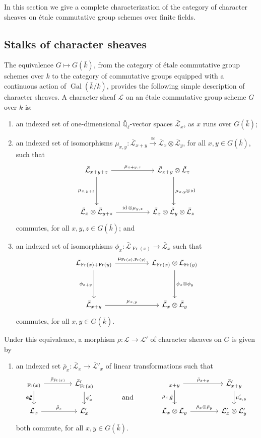 \documentclass[10pt]{amsart}
\makeatletter
\theoremstyle{plain}
\theoremstyle{definition}
\newcommand{\EE}{\mathbb{\bar Q}_\ell}
\newcommand{\bFq}{\bar{k}}
\newcommand{\Fq}{k}
\DeclareMathOperator{\Gal}{Gal}
\newcommand{\Frob}[1]{\operatorname{Fr}_{#1}}
\DeclareMathOperator{\id}{id}
\newcommand{\iso}{{\ \cong\ }}
\newcommand{\cs}[1]{{\mathcal{#1}}}
\newcommand{\gcs}[1]{{\mathcal{\bar #1}}}
\newcommand{\labitem}[2]{
\def\@itemlabel{\textbf{#1}}
\item
\def\@currentlabel{#1}\label{#2}}
\newcommand{\brho}{{\bar\rho}}
\newcommand{\tight}[3]{\hspace{-#1pt}{#2}\hspace{-#3pt}}
\makeatother
\begin{document}
In this section we give a complete characterization of the category of character sheaves on \'etale commutative group schemes over finite fields.

\subsection{Stalks of character sheaves}\label{ssec:stalks}

The equivalence $G \mapsto G(\bFq)$,
from the category of \'etale commutative group schemes over $\Fq$ to the category of commutative groups equipped
with a continuous action of $\Gal(\bFq/\Fq)$,
provides the following simple description of character sheaves.
%
A character sheaf $\cs{L}$ on an \'etale commutative group scheme $G$ over $\Fq$ is:
\begin{enumerate}
 \labitem{(cs.1)}{cs.1} an indexed set of one-dimensional
  $\EE$-vector spaces $\gcs{L}_x$, as $x$ runs over
  $G(\bFq)$;

 \labitem{(cs.2)}{cs.2} an indexed set of isomorphisms
  $\mu_{x,y} : \gcs{L}_{x+y} \xrightarrow{\iso} \gcs{L}_{x} \otimes\gcs{L}_{y}$,
  for all $x,y \in G(\bFq)$, such that
  \[
   \begin{tikzcd}[row sep=40]
    \gcs{L}_{x+y+z} \arrow{rr}{\mu_{x+y,z}} \arrow[swap]{d}{\mu_{x,y+z}}
    && \gcs{L}_{x+y}\otimes\gcs{L}_{z} \dar{\mu_{x,y} \tight{0.5}{\otimes}{1} \id} \\
    \gcs{L}_{x} \otimes\gcs{L}_{y+z} \arrow{rr}{\id \otimes\mu_{y,z}}
    && \gcs{L}_{x} \otimes\gcs{L}_{y} \otimes\gcs{L}_{z}
   \end{tikzcd}
  \]
  commutes, for all $x,y,z\in G(\bFq)$; and
 \labitem{(cs.3)}{cs.3} an indexed set of isomorphisms $\phi_{x} : \gcs{L}_{\Frob{}(x)} \to \gcs{L}_x$
  such that
  \[
   \begin{tikzcd}[row sep=40]
    \gcs{L}_{\Frob{}(x)+\Frob{}(y)} \arrow[swap]{d}{\phi_{x+y}} \arrow{rr}{\mu_{\Frob{}(x),\Frob{}(y)}}
    && \gcs{L}_{\Frob{}(x)}\otimes\gcs{L}_{\Frob{}(y)} \dar{\phi_x \tight{0}{\otimes}{0} \phi_y} \\
    \gcs{L}_{x+y} \arrow{rr}{\mu_{x,y}}
    && \gcs{L}_x \otimes\gcs{L}_y
   \end{tikzcd}
  \]
  commutes, for all $x,y\in G(\bFq)$.
\end{enumerate}
Under this equivalence, a morphism $\rho : \cs{L} \to \cs{L'}$ of character sheaves on $G$ is given by
\begin{enumerate}
 \labitem{(cs.4)}{cs.4} an indexed set $\brho_x : \gcs{L}_x \to \gcs{L'}_x$
  of linear transformations such that
  \[
   \begin{tikzcd}[column sep=40]
    \arrow[swap]{d}{\phi_x} \gcs{L}_{\Frob{}(x)} \rar{\brho_{\Frob{}(x)}} & \gcs{L'}_{\Frob{}(x)} \dar{\phi_x'}
    &\arrow[draw=none]{d}[pos=.4,description]{\text{\normalsize{and}}}
    & \arrow[swap]{d}{\mu_{x,y}} \gcs{L}_{x+y} \rar{\brho_{x+y}} & \gcs{L'}_{x+y} \dar{\mu'_{x,y}} \\
    \gcs{L}_x \rar{\brho_x} & \gcs{L'}_x
    & {} & \gcs{L}_x\otimes\gcs{L}_y \rar{\brho_x\otimes\brho_y} & \gcs{L'}_x \otimes\gcs{L'}_y
   \end{tikzcd}
  \]
  both commute, for all $x, y \in G(\bFq)$.
\end{enumerate}
\end{document}
